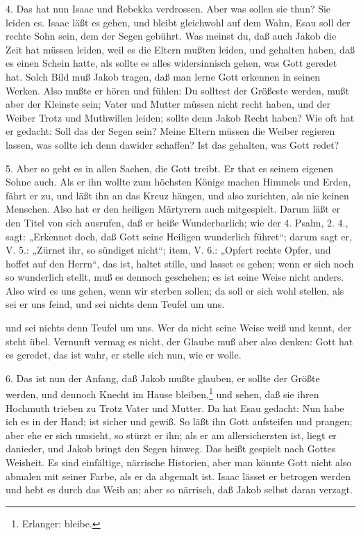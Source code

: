 4. Das hat nun Isaac und Rebekka verdrossen. Aber was sollen sie thun? Sie leiden es. Isaac läßt es gehen, und bleibt gleichwohl auf dem Wahn, Esau soll der rechte Sohn sein, dem der Segen gebührt. Was meinst du, daß auch Jakob die Zeit hat müssen leiden, weil es die Eltern mußten leiden, und gehalten haben, daß es einen Schein hatte, als sollte es alles widersinnisch gehen, was Gott geredet hat. Solch Bild muß Jakob tragen, daß man lerne Gott erkennen in seinen Werken. Also mußte er hören und fühlen: Du solltest der Größeste werden, mußt aber der Kleinste sein; Vater und Mutter müssen nicht recht haben, und der Weiber Trotz und Muthwillen leiden; sollte denn Jakob Recht haben? Wie oft hat er gedacht: Soll das der Segen sein? Meine Eltern müssen die Weiber regieren lassen, was sollte ich denn dawider schaffen? Ist das gehalten, was Gott redet?

5. Aber so geht es in allen Sachen, die Gott treibt. Er that es seinem eigenen Sohne auch. Als er ihn wollte zum höchsten Könige machen Himmels und Erden, fährt er zu, und läßt ihn an das Kreuz hängen, und also zurichten, als nie keinen Menschen. Also hat er den heiligen Märtyrern auch mitgespielt. Darum läßt er den Titel von sich ausrufen, daß er heiße Wunderbarlich; wie der 4. Psalm, 2. 4., sagt: „Erkennet doch, daß Gott seine Heiligen wunderlich führet“; darum sagt er, V. 5.: „Zürnet ihr, so sündiget nicht“; item, V. 6.: „Opfert rechte Opfer, und hoffet auf den Herrn“, das ist, haltet stille, und lasset es gehen; wenn er sich noch so wunderlich stellt, muß es dennoch geschehen; es ist seine Weise nicht anders. Also wird es uns gehen, wenn wir sterben sollen; da soll er sich wohl stellen, als sei er uns feind, und sei nichts denn Teufel um uns.

und sei nichts denn Teufel um uns. Wer da nicht seine Weise weiß und kennt, der steht übel. Vernunft vermag es nicht, der Glaube muß aber also denken: Gott hat es geredet, das ist wahr, er stelle sich nun, wie er wolle.

6. Das ist nun der Anfang, daß Jakob mußte glauben, er sollte der Größte werden, und dennoch Knecht im Hause bleiben,\footnote{Erlanger: bleibe.} und sehen, daß sie ihren Hochmuth trieben zu Trotz Vater und Mutter. Da hat Esau gedacht: Nun habe ich es in der Hand; ist sicher und gewiß. So läßt ihn Gott aufsteifen und prangen; aber ehe er sich umsieht, so stürzt er ihn; als er am allersichersten ist, liegt er danieder, und Jakob bringt den Segen hinweg. Das heißt gespielt nach Gottes Weisheit. Es sind einfältige, närrische Historien, aber man könnte Gott nicht also abmalen mit seiner Farbe, als er da abgemalt ist. Isaac lässet er betrogen werden und hebt es durch das Weib an; aber so närrisch, daß Jakob selbst daran verzagt.

